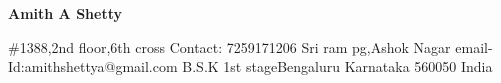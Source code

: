\documentclass[10pt]{article}
\begin{document}
	

	\begin{center}
		\bfseries{\large Amith A Shetty}
	\end{center}

	\noindent\makebox[\linewidth]{\rule{\textwidth}{1.8pt}}
	
	
   \#1388,2nd floor,6th cross  \hfill Contact: 7259171206 
	\newline  Sri ram pg,Ashok Nagar  \hfill email-Id:amithshettya@gmail.com
	\newline  B.S.K 1st stageBengaluru
	\newline  Karnataka 560050
	\newline  India
	
	
\end{document}
